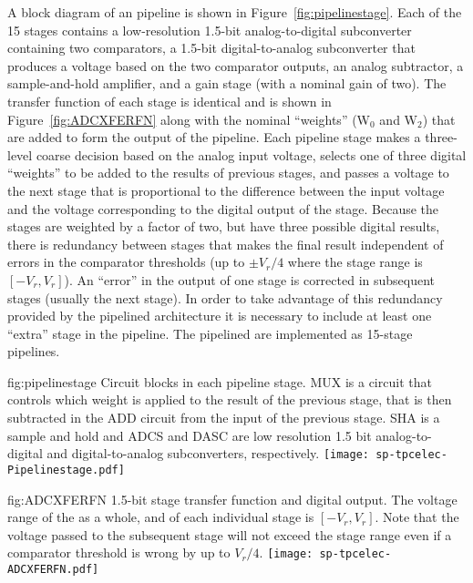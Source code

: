 A block diagram of an  pipeline is shown in
Figure~\ref{fig:pipelinestage}. Each of the \num{15} stages contains a low-resolution
\num{1.5}-bit analog-to-digital subconverter containing two comparators, a
\num{1.5}-bit digital-to-analog subconverter that produces a voltage based on
the two comparator outputs, an analog subtractor, a sample-and-hold amplifier,
and a gain stage (with a nominal gain of two). The transfer function of
each stage is identical and is shown in Figure~\ref{fig:ADCXFERFN} along with
the nominal ``weights'' (W$_0$ and W$_2$) that are added to form the output of the
pipeline. Each pipeline stage makes a three-level coarse decision based on the
analog input voltage, selects one of three digital ``weights'' to be added to the
results of previous stages, and passes a voltage to the next stage that is
proportional to the difference between the input voltage and the voltage
corresponding to the digital output of the stage.  Because the stages are
weighted by a factor of two, but have three possible digital results, there is
redundancy between stages that makes the final result independent of errors in
the comparator thresholds (up to $\pm V_r/4$ where the stage range is
$[-V_r,V_r]$).  An ``error'' in the output of one stage is corrected in subsequent
stages (usually the next stage).  In order to take advantage of this redundancy
provided by the pipelined architecture it is necessary to include at least one
``extra'' stage in the pipeline.  The  pipelined  are
implemented as \num{15}-stage pipelines.

\begin{dunefigure}
{fig:pipelinestage}
{Circuit blocks in each  pipeline stage. MUX is a circuit that controls
which weight is applied to the result of the previous stage, that is then subtracted
in the ADD circuit from the input of the previous stage. SHA is a sample and hold and
ADCS and DASC are low resolution 1.5 bit analog-to-digital and digital-to-analog 
subconverters, respectively.}
\texttt{[image: sp-tpcelec-Pipelinestage.pdf]}
\end{dunefigure}

\begin{dunefigure}
{fig:ADCXFERFN}
{\num{1.5}-bit stage transfer function and digital output. The voltage 
range of the  as a whole, and of each individual stage 
is $[-V_r,V_r]$.  Note that the voltage passed to the subsequent 
stage will not exceed the stage range even if a comparator threshold 
is wrong by up to $V_r/4$.}
\texttt{[image: sp-tpcelec-ADCXFERFN.pdf]}
\end{dunefigure}


